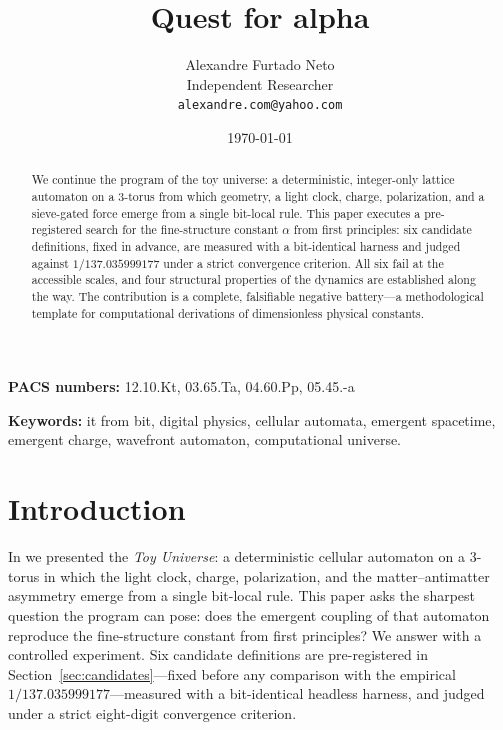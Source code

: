 \documentclass[11pt,a4paper]{article}
\title{\textbf{Quest for alpha}}
\author{Alexandre Furtado Neto\\
        \small Independent Researcher\\
        \small \texttt{alexandre.com@yahoo.com}}
\date{\today}
\begin{document}
\maketitle

\begin{abstract}
We continue the program of the toy universe: a deterministic, integer-only
lattice automaton on a 3-torus from which geometry, a light clock, charge,
polarization, and a sieve-gated force emerge from a single bit-local rule.
This paper executes a pre-registered search for the fine-structure constant
$\alpha$ from first principles: six candidate definitions, fixed in advance,
are measured with a bit-identical harness and judged against
$1/137.035999177$ under a strict convergence criterion. All six fail at the
accessible scales, and four structural properties of the dynamics are
established along the way. The contribution is a complete, falsifiable
negative battery---a methodological template for computational derivations of
dimensionless physical constants.
\end{abstract}

\noindent\textbf{PACS numbers: }12.10.Kt, 03.65.Ta, 04.60.Pp, 05.45.-a

\noindent\textbf{Keywords:} it from bit, digital physics, cellular automata,
emergent spacetime, emergent charge, wavefront automaton, computational
universe.

\section{Introduction}
\label{sec:intro}

In \cite{itfrombit} we presented the \emph{Toy Universe}: a deterministic
cellular automaton on a 3-torus in which the light clock, charge,
polarization, and the matter--antimatter asymmetry emerge from a single
bit-local rule. This paper asks the sharpest question the program can pose:
does the emergent coupling of that automaton reproduce the fine-structure
constant from first principles? We answer with a controlled experiment. Six
candidate definitions are pre-registered in Section~\ref{sec:candidates}---fixed
before any comparison with the empirical $1/137.035999177$---measured with a
bit-identical headless harness, and judged under a strict eight-digit
convergence criterion.
\end{document}
